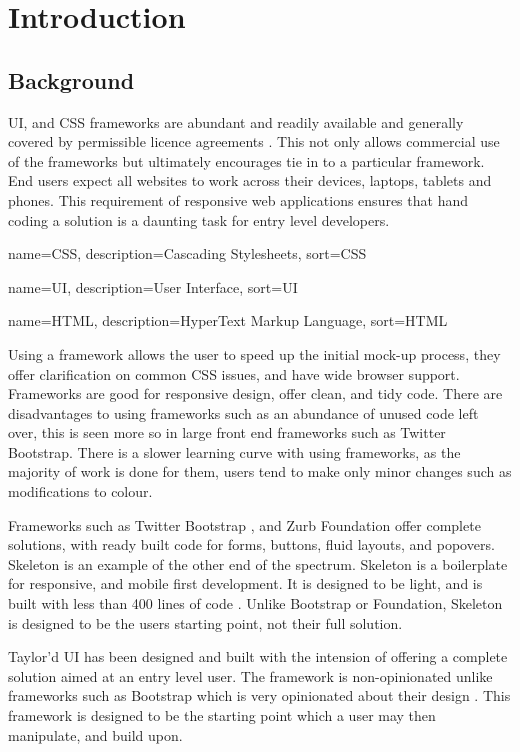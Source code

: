 \newpage
\chapter*{Introduction}
\section*{Background}

\gls{UI}, and \gls{CSS} frameworks are abundant and readily available and generally covered by permissible licence agreements \citep{CODY16}. This not only allows commercial use of the frameworks but ultimately encourages tie in to a particular framework. End users expect all websites to work across their devices, laptops, tablets and phones. This requirement of responsive web applications ensures that hand coding a solution is a daunting task for entry level developers.

%
{
  name={CSS},
  description={Cascading Stylesheets},
  sort=CSS
}
%


%
{
  name={UI},
  description={User Interface},
  sort=UI
}
%

{
  name={HTML},
  description={HyperText Markup Language},
  sort=HTML
}

Using a framework allows the user to speed up the initial mock-up process, they offer clarification on common \gls{CSS} issues, and have wide browser support. Frameworks are good for responsive design, offer clean, and tidy code. There are disadvantages to using frameworks such as an abundance of unused code left over, this is seen more so in large front end frameworks such as Twitter Bootstrap. There is a slower learning curve with using frameworks, as the majority of work is done for them, users tend to make only minor changes such as modifications to colour.

Frameworks such as Twitter Bootstrap \citep*{SASS16}, and Zurb Foundation \citep*{LESS16} offer complete solutions, with ready built code for forms, buttons, fluid layouts, and popovers. Skeleton is an example of the other end of the spectrum. Skeleton is a boilerplate for responsive, and mobile first development. It is designed to be light, and is built with less than 400 lines of code \citep{SKEL16}. Unlike Bootstrap or Foundation, Skeleton is designed to be the users starting point, not their full solution. 

Taylor'd UI has been designed and built with the intension of offering a complete solution aimed at an entry level user. The framework is non-opinionated unlike frameworks such as Bootstrap which is very opinionated about their design \citep{KEMH16}. This framework is designed to be the starting point which a user may then manipulate, and build upon.

